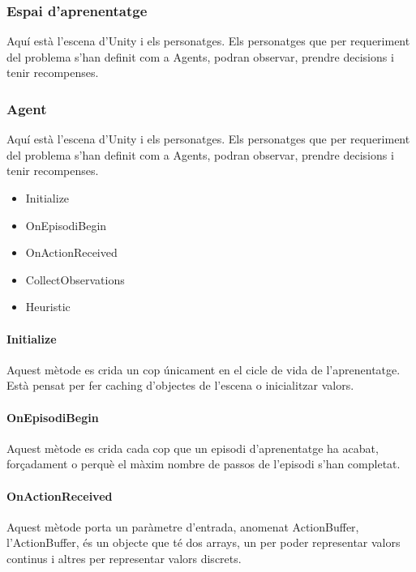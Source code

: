 \documentclass{article}
\begin{document}
    \newpage
    
    \subsubsection{Espai d'aprenentatge}
    Aquí està l'escena d'Unity i els personatges. Els personatges que per requeriment del problema s'han definit com a Agents, podran observar, prendre decisions i tenir recompenses.
    
    \subsubsection{Agent}
    Aquí està l'escena d'Unity i els personatges. Els personatges que per requeriment del problema s'han definit com a Agents, podran observar, prendre decisions i tenir recompenses.
    \begin{itemize}
        \item Initialize
        \item OnEpisodiBegin
        \item OnActionReceived
        \item CollectObservations
        \item Heuristic
    \end{itemize}
    
    \newpage
    
    \paragraph{Initialize}
    Aquest mètode es crida un cop únicament en el cicle de vida de l'aprenentatge. Està pensat per fer caching d'objectes de l'escena o inicialitzar valors.
    
    \paragraph{OnEpisodiBegin}
    Aquest mètode es crida cada cop que un episodi d'aprenentatge ha acabat, forçadament o perquè el màxim nombre de passos de l'episodi s'han completat.
    
    \paragraph{OnActionReceived}
    Aquest mètode porta un paràmetre d'entrada, anomenat ActionBuffer, l'ActionBuffer, és un objecte que té dos arrays, un per poder representar valors continus i altres per representar valors discrets.
    
\end{document}
